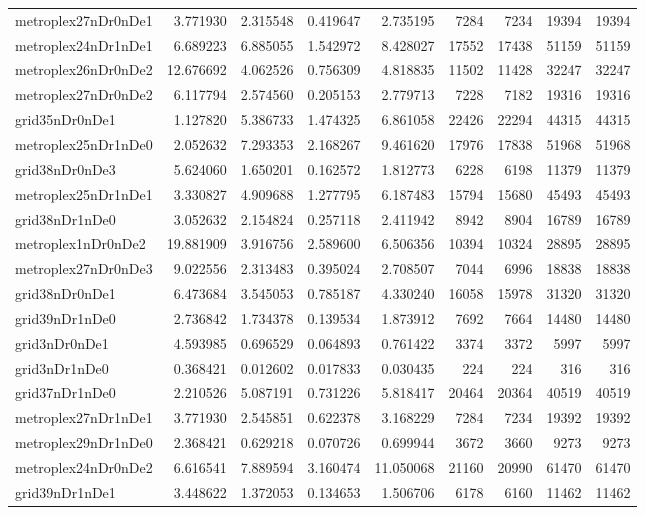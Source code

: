 \begin{longtable}{|l|r|r|r|r|r|r|r|r|}
metroplex27nDr0nDe1 & 3.771930 & 2.315548 & 0.419647 & 2.735195 & 7284 & 7234 & 19394 & 19394 \\
metroplex24nDr1nDe1 & 6.689223 & 6.885055 & 1.542972 & 8.428027 & 17552 & 17438 & 51159 & 51159 \\
metroplex26nDr0nDe2 & 12.676692 & 4.062526 & 0.756309 & 4.818835 & 11502 & 11428 & 32247 & 32247 \\
metroplex27nDr0nDe2 & 6.117794 & 2.574560 & 0.205153 & 2.779713 & 7228 & 7182 & 19316 & 19316 \\
grid35nDr0nDe1 & 1.127820 & 5.386733 & 1.474325 & 6.861058 & 22426 & 22294 & 44315 & 44315 \\
metroplex25nDr1nDe0 & 2.052632 & 7.293353 & 2.168267 & 9.461620 & 17976 & 17838 & 51968 & 51968 \\
grid38nDr0nDe3 & 5.624060 & 1.650201 & 0.162572 & 1.812773 & 6228 & 6198 & 11379 & 11379 \\
metroplex25nDr1nDe1 & 3.330827 & 4.909688 & 1.277795 & 6.187483 & 15794 & 15680 & 45493 & 45493 \\
grid38nDr1nDe0 & 3.052632 & 2.154824 & 0.257118 & 2.411942 & 8942 & 8904 & 16789 & 16789 \\
metroplex1nDr0nDe2 & 19.881909 & 3.916756 & 2.589600 & 6.506356 & 10394 & 10324 & 28895 & 28895 \\
metroplex27nDr0nDe3 & 9.022556 & 2.313483 & 0.395024 & 2.708507 & 7044 & 6996 & 18838 & 18838 \\
grid38nDr0nDe1 & 6.473684 & 3.545053 & 0.785187 & 4.330240 & 16058 & 15978 & 31320 & 31320 \\
grid39nDr1nDe0 & 2.736842 & 1.734378 & 0.139534 & 1.873912 & 7692 & 7664 & 14480 & 14480 \\
grid3nDr0nDe1 & 4.593985 & 0.696529 & 0.064893 & 0.761422 & 3374 & 3372 & 5997 & 5997 \\
grid3nDr1nDe0 & 0.368421 & 0.012602 & 0.017833 & 0.030435 & 224 & 224 & 316 & 316 \\
grid37nDr1nDe0 & 2.210526 & 5.087191 & 0.731226 & 5.818417 & 20464 & 20364 & 40519 & 40519 \\
metroplex27nDr1nDe1 & 3.771930 & 2.545851 & 0.622378 & 3.168229 & 7284 & 7234 & 19392 & 19392 \\
metroplex29nDr1nDe0 & 2.368421 & 0.629218 & 0.070726 & 0.699944 & 3672 & 3660 & 9273 & 9273 \\
metroplex24nDr0nDe2 & 6.616541 & 7.889594 & 3.160474 & 11.050068 & 21160 & 20990 & 61470 & 61470 \\
grid39nDr1nDe1 & 3.448622 & 1.372053 & 0.134653 & 1.506706 & 6178 & 6160 & 11462 & 11462 \\

\end{longtable}
